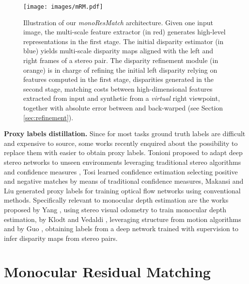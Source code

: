 \documentclass[10pt,twocolumn,letterpaper]{article}
\begin{document}
\begin{figure*}
\centering
\texttt{[image: images/mRM.pdf]}
\caption{Illustration of our \textit{monoResMatch} architecture. Given one input image, the multi-scale feature extractor (in red) generates high-level representations in the first stage. The initial disparity estimator (in blue) yields multi-scale disparity maps aligned with the left and right frames of a stereo pair. The disparity refinement module (in orange) is in charge of refining the initial left disparity relying on features computed in the first stage, disparities generated in the second stage, matching costs between high-dimensional features  extracted from input and synthetic  from a \emph{virtual} right viewpoint, together with absolute error  between  and back-warped  (see Section \ref{sec:refinement}). }
\label{fig:monoResMatch}
\end{figure*}     
\textbf{Proxy labels distillation.} Since for most tasks ground truth labels are difficult and expensive to source, some works recently enquired about the possibility to replace them with easier to obtain proxy labels. Tonioni \etal \cite{Tonioni_2017_ICCV} proposed to adapt deep stereo networks to unseen environments leveraging traditional stereo algorithms and confidence measures \cite{Poggi_2017_ICCV}, Tosi \etal \cite{Tosi_2017_BMVC} learned confidence estimation selecting positive and negative matches by means of traditional confidence measures, Makansi \etal \cite{makansi2018fusionnet} and Liu \etal \cite{DDFlow} generated proxy labels for training optical flow networks using conventional methods.
Specifically relevant to monocular depth estimation are the works proposed by Yang \etal \cite{yang2018deep}, using stereo visual odometry to train monocular depth estimation, by Klodt and Vedaldi \cite{Klodt_2018_ECCV}, leveraging structure from motion algorithms and by Guo \etal \cite{guo2018learning}, obtaining labels from a deep network trained with supervision to infer disparity maps from stereo pairs.




\section{Monocular Residual Matching}
\end{document}
